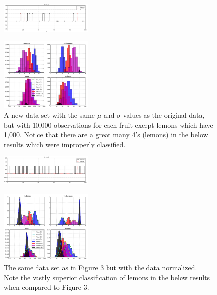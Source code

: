 \begin{multicols}{2}
\begin{figure}[H]
  \centering
		\includegraphics[width=0.4\textwidth]{images/normed_original_results.png}
\end{figure}

\end{multicols}
\begin{multicols}{2}

\begin{figure}[H]
  \centering
		\includegraphics[width=0.4\textwidth]{images/not_normed_new.png}
  \caption{\scriptsize A new data set with the same $\mu$ and $\sigma$ values as the original data, but with 10,000 observations for each fruit except lemons which have 1,000.  Notice that there are a great many 4's (lemons) in the below results which were improperly classified.}
\end{figure}

\begin{figure}[H]
  \centering
		\includegraphics[width=0.4\textwidth]{images/not_normed_new_results.png}
\end{figure}

\begin{figure}[H]
  \centering
		\includegraphics[width=0.4\textwidth]{images/normed_new.png}
  \caption{\scriptsize The same data set as in Figure 3 but with the data normalized.  Note the vastly superior classification of lemons in the below results when compared to Figure 3.}
\end{figure}


\end{multicols}
